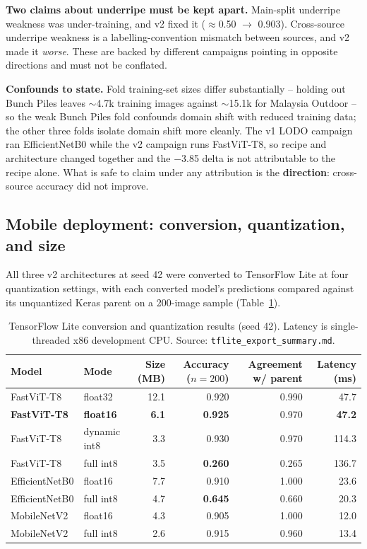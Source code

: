 \documentclass{article}
\begin{document}
\textbf{Two claims about underripe must be kept apart.} Main-split underripe weakness was under-training,
and v2 fixed it ($\approx$0.50 $\rightarrow$ 0.903). Cross-source underripe weakness is a
labelling-convention mismatch between sources, and v2 made it \textit{worse}. These are backed by different
campaigns pointing in opposite directions and must not be conflated.

\textbf{Confounds to state.} Fold training-set sizes differ substantially -- holding out Bunch Piles leaves
$\sim$4.7k training images against $\sim$15.1k for Malaysia Outdoor -- so the weak Bunch Piles fold
confounds domain shift with reduced training data; the other three folds isolate domain shift more
cleanly. The v1 LODO campaign ran EfficientNetB0 while the v2 campaign runs FastViT-T8, so recipe and
architecture changed together and the $-$3.85 delta is not attributable to the recipe alone. What is safe
to claim under any attribution is the \textbf{direction}: cross-source accuracy did not improve.

\subsection{Mobile deployment: conversion, quantization, and size}
\label{sec:deployment}

All three v2 architectures at seed 42 were converted to TensorFlow Lite at four quantization settings,
with each converted model's predictions compared against its unquantized Keras parent on a 200-image
sample (Table~\ref{tab:tflite}).

\begin{table}[t]
\centering
\caption{TensorFlow Lite conversion and quantization results (seed 42). Latency is single-threaded x86
development CPU. Source: \texttt{tflite\_export\_summary.md}.}
\label{tab:tflite}
\begin{tabular}{@{}llrrrr@{}}
\toprule
Model & Mode & Size (MB) & Accuracy ($n{=}200$) & Agreement w/ parent & Latency (ms) \\
\midrule
FastViT-T8 & float32 & 12.1 & 0.920 & 0.990 & 47.7 \\
\textbf{FastViT-T8} & \textbf{float16} & \textbf{6.1} & \textbf{0.925} & 0.970 & \textbf{47.2} \\
FastViT-T8 & dynamic int8 & 3.3 & 0.930 & 0.970 & 114.3 \\
FastViT-T8 & full int8 & 3.5 & \textbf{0.260} & 0.265 & 136.7 \\
EfficientNetB0 & float16 & 7.7 & 0.910 & 1.000 & 23.6 \\
EfficientNetB0 & full int8 & 4.7 & \textbf{0.645} & 0.660 & 20.3 \\
MobileNetV2 & float16 & 4.3 & 0.905 & 1.000 & 12.0 \\
MobileNetV2 & full int8 & 2.6 & 0.915 & 0.960 & 13.4 \\
\bottomrule
\end{tabular}
\end{table}
\end{document}
